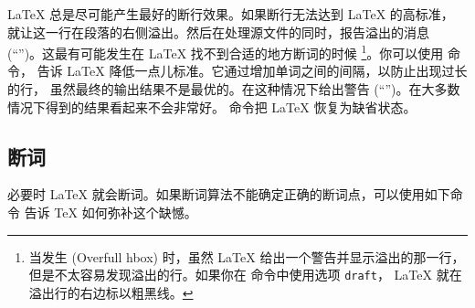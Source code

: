 \LaTeX{} 总是尽可能产生最好的断行效果。如果断行无法达到 \LaTeX{} 的高标准，
就让这一行在段落的右侧溢出。然后在处理源文件的同时，报告溢出的消息 
(``'')。这最有可能发生在 \LaTeX{} 找不到合适的地方断词的时候
\footnote{当发生 (Overfull
hbox) 时，虽然 \LaTeX{} 给出一个警告并显示溢出的那一行，
但是不太容易发现溢出的行。如果你在  命令中使用选项 \texttt{draft}，
\LaTeX{} 就在溢出行的右边标以粗黑线。}。你可以使用  命令，
告诉 \LaTeX{} 降低一点儿标准。它通过增加单词之间的间隔，以防止出现过长的行，
虽然最终的输出结果不是最优的。在这种情况下给出警告 (``'')。在大多数情况下得到的结果看起来不会非常好。
 命令把 \LaTeX{} 恢复为缺省状态。

\subsection{断词} \label{hyph}

必要时 \LaTeX{} 就会断词。如果断词算法不能确定正确的断词点，可以使用如下命令
告诉 \TeX{} 如何弥补这个缺憾。

